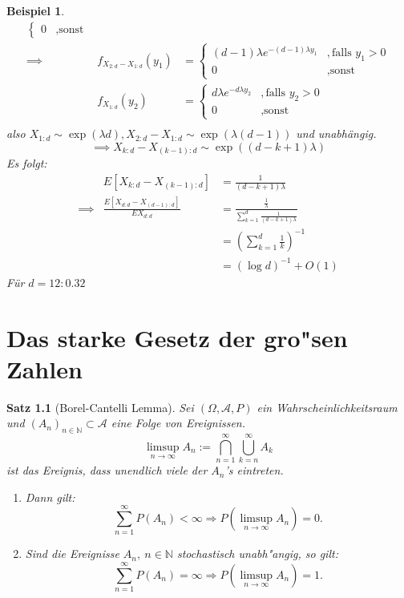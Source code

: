 \documentclass[a4paper,11pt]{scrbook}
\newcommand{\N}{{\mathbb N}}
\def\AA{ \mathcal{A} }
\def\folgt{\ensuremath{\implies}}
\newtheorem{Sa}{Satz}[chapter]
\newtheorem{Bsp}{Beispiel}[chapter]
\theoremstyle{nonumberplain}
\begin{document}
\begin{Bsp}
\begin{eqnarray*}
\begin{cases}
0&,\text{sonst}
\end{cases}\\
\folgt&f_{X_{2:d}-X_{1:d}}(y_1)&=\begin{cases}
(d-1)\lambda e^{-(d-1)\lambda y_1} &,\text{falls } y_1>0\\
0&,\text{sonst}
\end{cases}\\
&f_{X_{1:d}}(y_2)&=\begin{cases}
d\lambda e^{-d\lambda y_2} &,\text{falls } y_2>0\\
0&,\text{sonst}
\end{cases}\\
\end{eqnarray*}
also $X_{1:d}\sim\exp(\lambda d), X_{2:d}-X_{1:d}\sim\exp(\lambda(d-1))$ und unabhängig.
$$\folgt X_{k:d}-X_{(k-1):d}\sim\exp((d-k+1)\lambda)$$
Es folgt:
\begin{eqnarray*}
&E[X_{k:d}-X_{(k-1):d}]&=\frac{1}{(d-k+1)\lambda}\\
\folgt & \frac{E[X_{d:d}-X_{(d-1):d}]}{EX_{d:d}} &=\frac{\frac 1 \lambda}{\sum_{k=1}^d\frac{1}{(d-k+1)\lambda}}\\
& &=\left(\sum_{k=1}^d\frac 1 k\right)^{-1}\\
& &=(\log d)^{-1}+O(1)
\end{eqnarray*}
Für $d=12: 0.32$
\end{Bsp}


\chapter{Das starke Gesetz der gro"sen Zahlen}

\begin{Sa}[Borel-Cantelli Lemma] \label{Sa4.1}
Sei $(\Omega,\AA,P)$ ein Wahrscheinlichkeitsraum und $(A_n)_{n \in \N} \subset \AA$ eine Folge von Ereignissen.
\[
\limsup_{n \rightarrow \infty} A_n := \bigcap_{n=1}^{\infty} \bigcup_{k=n}^{\infty} A_k
\]
ist das Ereignis, dass unendlich viele der $A_n$'s eintreten.
\begin{enumerate}
\item[a)] Dann gilt: 
\[
\sum_{n=1}^{\infty} P(A_n) < \infty \Longrightarrow P(\limsup_{n \rightarrow \infty} A_n) = 0.
\]

\item[b)] Sind die Ereignisse $A_n,\ n \in \N$ stochastisch unabh"angig, so gilt:
\[
\sum_{n=1}^{\infty} P(A_n) = \infty \Longrightarrow P(\limsup_{n \rightarrow \infty}A_n) = 1.
\]
\end{enumerate}
\end{Sa}
\end{document}
